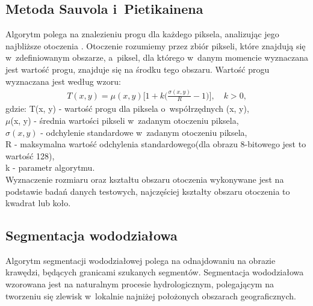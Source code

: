 \subsection{Metoda Sauvola i~Pietikainena}
Algorytm polega na znalezieniu progu dla każdego piksela, analizując jego najbliższe otoczenia \cite{sauvola00}. Otoczenie rozumiemy przez zbiór pikseli, które znajdują się w~zdefiniowanym obszarze, a~piksel, dla którego w~danym momencie wyznaczana jest wartość progu, znajduje się na środku tego obszaru. Wartość progu wyznaczana jest według wzoru:
\begin{gather*}
  T(x, y) = \mu(x, y)\Big[1+k\big(\frac{\sigma(x, y)}{R} - 1\big)\Big], \quad k > 0,
\end{gather*}
gdzie:
T(x, y) - wartość progu dla piksela o~współrzędnych (x, y),\\
$\mu$(x, y) - średnia wartości pikseli w~zadanym otoczeniu piksela,\\
$\sigma(x, y)$ - odchylenie standardowe w~zadanym otoczeniu piksela,\\
R - maksymalna wartość odchylenia standardowego(dla obrazu 8-bitowego jest to wartość 128),\\
k - parametr algorytmu. \\
Wyznaczenie rozmiaru oraz kształtu obszaru otoczenia wykonywane jest na podstawie badań danych testowych, najczęściej kształty obszaru otoczenia to kwadrat lub koło.
\subsection{Segmentacja wododziałowa}
Algorytm segmentacji wododziałowej polega na odnajdowaniu na obrazie krawędzi, będących granicami szukanych segmentów. Segmentacja wododziałowa wzorowana jest na naturalnym procesie hydrologicznym, polegającym na tworzeniu się zlewisk w~lokalnie najniżej położonych obszarach geograficznych. \\

